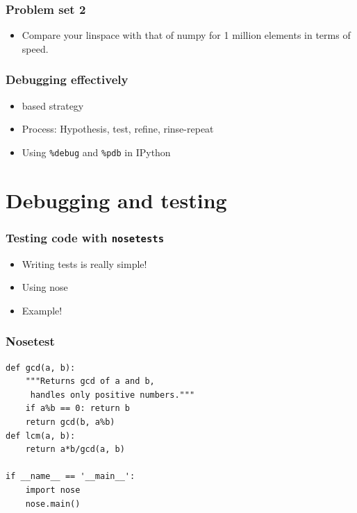 \documentclass[14pt,compress]{beamer}
\newcounter{time}
\newcommand{\inctime}[1]{\addtocounter{time}{#1}{\tiny \thetime\ m}}
\newcommand{\typ}[1]{\texttt{#1}}
\newcommand{\kwrd}[1]{ \texttt{\textbf{\color{blue}{#1}}}  }
\begin{document}
\begin{frame}
  \frametitle{Problem set 2}
  \begin{itemize}
    \item Compare your linspace with that of numpy for 1 million
        elements in terms of speed.
\end{itemize}
\inctime{10}
\end{frame}


\begin{frame}[fragile]
    \frametitle{Debugging effectively}

    \begin{itemize}
        \item  \kwrd{print} based strategy
        \item Process: Hypothesis, test, refine, rinse-repeat
        \item Using \typ{\%debug} and \typ{\%pdb} in IPython
    \end{itemize}

    \inctime{10} 
\end{frame}

\section{Debugging and testing}

\begin{frame}[fragile]
    \frametitle{Testing code with \typ{nosetests}}
   
    \begin{itemize}
        \item Writing tests is really simple!

        \item Using nose

        \item Example!
    \end{itemize}
\end{frame}

\begin{frame}[fragile]
    \frametitle{Nosetest}
\begin{lstlisting}
def gcd(a, b):
    """Returns gcd of a and b, 
     handles only positive numbers."""
    if a%b == 0: return b
    return gcd(b, a%b)
def lcm(a, b):
    return a*b/gcd(a, b)

if __name__ == '__main__':
    import nose
    nose.main()
\end{lstlisting}

    \inctime{10} 
\end{frame}
\end{document}
